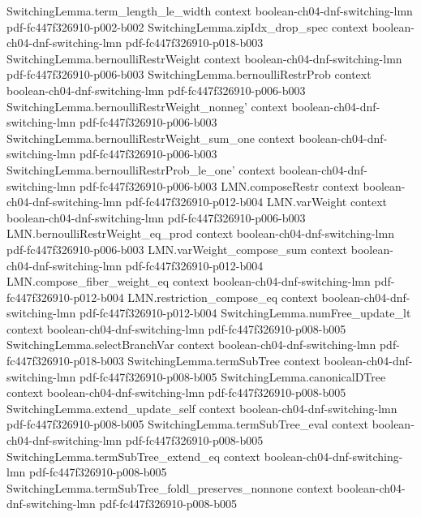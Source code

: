 \begin{theorem}
  {SwitchingLemma.term_length_le_width}
  {context}
  {boolean-ch04-dnf-switching-lmn}
  {pdf-fc447f326910-p002-b002}
\proofstep
  {SwitchingLemma.zipIdx_drop_spec}
  {context}
  {boolean-ch04-dnf-switching-lmn}
  {pdf-fc447f326910-p018-b003}
\proofstep
  {SwitchingLemma.bernoulliRestrWeight}
  {context}
  {boolean-ch04-dnf-switching-lmn}
  {pdf-fc447f326910-p006-b003}
\proofstep
  {SwitchingLemma.bernoulliRestrProb}
  {context}
  {boolean-ch04-dnf-switching-lmn}
  {pdf-fc447f326910-p006-b003}
\proofstep
  {SwitchingLemma.bernoulliRestrWeight_nonneg'}
  {context}
  {boolean-ch04-dnf-switching-lmn}
  {pdf-fc447f326910-p006-b003}
\proofstep
  {SwitchingLemma.bernoulliRestrWeight_sum_one}
  {context}
  {boolean-ch04-dnf-switching-lmn}
  {pdf-fc447f326910-p006-b003}
\proofstep
  {SwitchingLemma.bernoulliRestrProb_le_one'}
  {context}
  {boolean-ch04-dnf-switching-lmn}
  {pdf-fc447f326910-p006-b003}
\proofstep
  {LMN.composeRestr}
  {context}
  {boolean-ch04-dnf-switching-lmn}
  {pdf-fc447f326910-p012-b004}
\proofstep
  {LMN.varWeight}
  {context}
  {boolean-ch04-dnf-switching-lmn}
  {pdf-fc447f326910-p006-b003}
\proofstep
  {LMN.bernoulliRestrWeight_eq_prod}
  {context}
  {boolean-ch04-dnf-switching-lmn}
  {pdf-fc447f326910-p006-b003}
\proofstep
  {LMN.varWeight_compose_sum}
  {context}
  {boolean-ch04-dnf-switching-lmn}
  {pdf-fc447f326910-p012-b004}
\proofstep
  {LMN.compose_fiber_weight_eq}
  {context}
  {boolean-ch04-dnf-switching-lmn}
  {pdf-fc447f326910-p012-b004}
\proofstep
  {LMN.restriction_compose_eq}
  {context}
  {boolean-ch04-dnf-switching-lmn}
  {pdf-fc447f326910-p012-b004}
\proofstep
  {SwitchingLemma.numFree_update_lt}
  {context}
  {boolean-ch04-dnf-switching-lmn}
  {pdf-fc447f326910-p008-b005}
\proofstep
  {SwitchingLemma.selectBranchVar}
  {context}
  {boolean-ch04-dnf-switching-lmn}
  {pdf-fc447f326910-p018-b003}
\proofstep
  {SwitchingLemma.termSubTree}
  {context}
  {boolean-ch04-dnf-switching-lmn}
  {pdf-fc447f326910-p008-b005}
\proofstep
  {SwitchingLemma.canonicalDTree}
  {context}
  {boolean-ch04-dnf-switching-lmn}
  {pdf-fc447f326910-p008-b005}
\proofstep
  {SwitchingLemma.extend_update_self}
  {context}
  {boolean-ch04-dnf-switching-lmn}
  {pdf-fc447f326910-p008-b005}
\proofstep
  {SwitchingLemma.termSubTree_eval}
  {context}
  {boolean-ch04-dnf-switching-lmn}
  {pdf-fc447f326910-p008-b005}
\proofstep
  {SwitchingLemma.termSubTree_extend_eq}
  {context}
  {boolean-ch04-dnf-switching-lmn}
  {pdf-fc447f326910-p008-b005}
\proofstep
  {SwitchingLemma.termSubTree_foldl_preserves_nonnone}
  {context}
  {boolean-ch04-dnf-switching-lmn}
  {pdf-fc447f326910-p008-b005}

\end{theorem}
